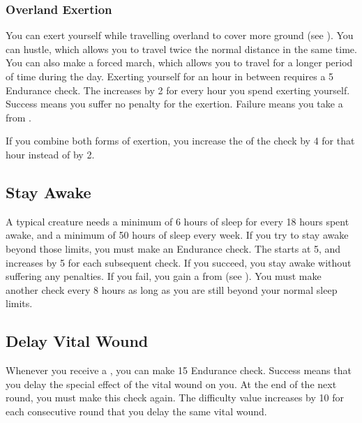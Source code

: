     \subsubsection{Overland Exertion}\label{Overland Exertion}
        You can exert yourself while travelling overland to cover more ground (see ).
        You can hustle, which allows you to travel twice the normal distance in the same time.
        You can also make a forced march, which allows you to travel for a longer period of time during the day.
        Exerting yourself for an hour in between  requires a  5 Endurance check.
        The  increases by 2 for every hour you spend exerting yourself.
        Success means you suffer no penalty for the exertion.
        Failure means you take a  from .

        If you combine both forms of exertion, you increase the  of the check by 4 for that hour instead of by 2.

    \subsection{Stay Awake}\label{Stay Awake}
        A typical creature needs a minimum of 6 hours of sleep for every 18 hours spent awake, and a minimum of 50 hours of sleep every week.
        If you try to stay awake beyond those limits, you must make an Endurance check.
        The  starts at 5, and increases by 5 for each subsequent check.
        If you succeed, you stay awake without suffering any penalties.
        If you fail, you gain a  from  (see ).
        You must make another check every 8 hours as long as you are still beyond your normal sleep limits.

    \subsection{Delay Vital Wound}\label{Delay Vital Wound}
        Whenever you receive a , you can make  15 Endurance check.
        Success means that you  delay the special effect of the vital wound on you.
        At the end of the next round, you must make this check again.
        The difficulty value increases by 10 for each consecutive round that you delay the same vital wound.

